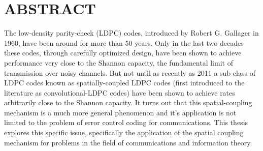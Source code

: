 %
%
%
%

\chapter*{ABSTRACT}

\pagestyle{plain} %
\setcounter{page}{2}

\indent The low-density parity-check (LDPC) codes, introduced by Robert G. Gallager in 1960, have been around for more than 50 years. Only in the last two decades these codes, through carefully optimized design, have been shown to achieve performance very close to the Shannon capacity, the fundamental limit of transmission over noisy channels. But not until as recently as 2011 a sub-class of LDPC codes known as spatially-coupled LDPC codes (first introduced to the literature as convolutional-LDPC codes) have been shown to achieve rates arbitrarily close to the Shannon capacity. It turns out that this spatial-coupling mechanism is a much more general phenomenon and it's application is not limited to the problem of error control coding for communications. This thesis explores this specific issue,  specifically the application of the spatial coupling mechanism for problems in the field of communications and information theory.


